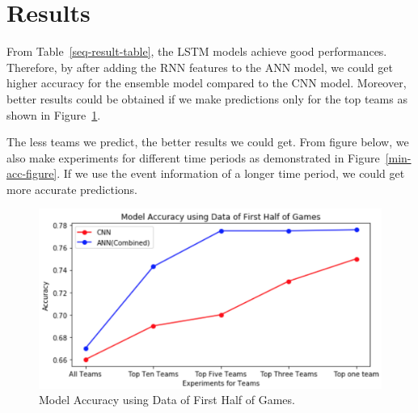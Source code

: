 \documentclass[11pt,a4paper]{article}
\begin{document}
\section{Results}

From Table~\ref{seq-result-table}, the LSTM models achieve good performances. Therefore, by after adding the RNN features to the ANN model, we could get higher accuracy for the ensemble model compared to the CNN model. Moreover, better results could be obtained if we make predictions only for the top teams as shown in Figure~\ref{acc-figure}.

The less teams we predict, the better results we could get. From figure below, we also make experiments for different time periods as demonstrated in Figure~\ref{min-acc-figure}. If we use the event information of a longer time period, we could get more accurate predictions.

\begin{table}[h!]
\begin{center}
\end{center}
\caption{\label{seq-result-table} Sequence of Events Prediction. }
\end{table}

\begin{figure}
\includegraphics[width=\columnwidth]{./img/fig-2.png}
\caption{\label{acc-figure} Model Accuracy using Data of First Half of Games.}
\end{figure}
\end{document}
